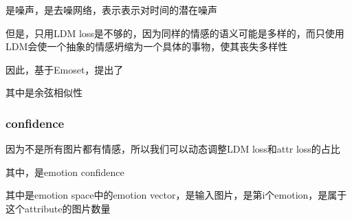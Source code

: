 \documentclass[
]{article}
\begin{document}
{}是噪声，{}是去噪网络，{}表示表示对时间{}的潜在噪声

但是，只用LDM
loss是不够的，因为同样的情感的语义可能是多样的，而只使用LDM会使一个抽象的情感坍缩为一个具体的事物，使其丧失多样性

因此，基于Emoset，提出了{}

其中{}是余弦相似性

\hypertarget{confidence}{%
\subsubsection{confidence}\label{confidence}}

因为不是所有图片都有情感，所以我们可以动态调整LDM loss和attr loss的占比

其中，{}是emotion confidence

其中{}是emotion space中的emotion
vector，{}是输入图片，{}是第i个emotion，{}是属于这个attribute的图片数量
\end{document}

